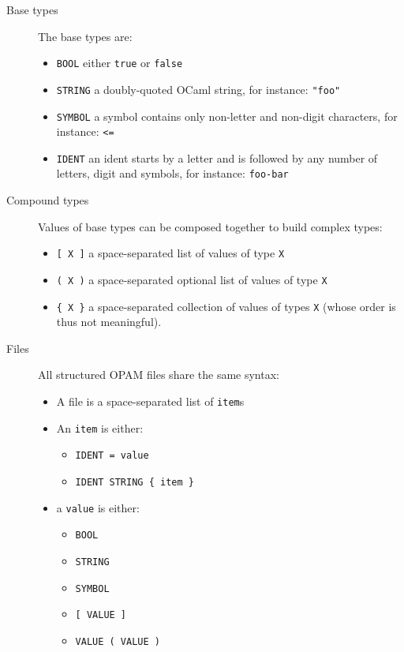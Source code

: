 \documentclass[a4paper,11pt]{article}
\begin{document}
\begin{description}

\item[Base types] The base types are:

\begin{itemize}
\item {\tt BOOL} either {\tt true} or {\tt false}
\item {\tt STRING} a doubly-quoted OCaml string, for instance: {\tt "foo"}
\item {\tt SYMBOL} a symbol contains only non-letter and non-digit
  characters, for instance: {\tt <=}
\item {\tt IDENT} an ident starts by a letter and is followed by any
  number of letters, digit and symbols, for instance: {\tt foo-bar}
\end{itemize}

\item[Compound types] Values of base types can be composed together to
  build complex types:

\begin{itemize}
\item {\tt [ X ]} a space-separated list of values of type {\tt X}
\item {\tt ( X )} a space-separated optional list of values of type
  {\tt X}
\item \verb+{ X }+ a space-separated collection of values of types
      {\tt X} (whose order is thus not meaningful).
\end{itemize}

\item[Files] All structured OPAM files share the same syntax:

\begin{itemize}

\item A file is a space-separated list of {\tt item}s

\item An {\tt item} is either:
\begin{itemize}
\item {\tt IDENT = value}
\item \verb+IDENT STRING { item }+
\end{itemize}

\item a {\tt value} is either:
\begin{itemize}
\item {\tt BOOL}
\item {\tt STRING}
\item {\tt SYMBOL}
\item {\tt [ VALUE ]}
\item \verb+VALUE ( VALUE )+
\end{itemize}

\end{itemize}
\end{description}
\end{document}
